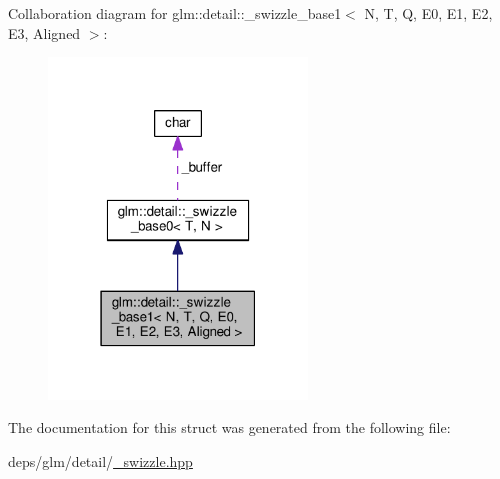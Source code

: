Collaboration diagram for glm\+:\+:detail\+:\+:\+\_\+swizzle\+\_\+base1$<$ N, T, Q, E0, E1, E2, E3, Aligned $>$\+:
\nopagebreak
\begin{figure}[H]
\begin{center}
\leavevmode
\includegraphics[width=195pt]{d6/d25/structglm_1_1detail_1_1__swizzle__base1__coll__graph}
\end{center}
\end{figure}


The documentation for this struct was generated from the following file\+:\begin{DoxyCompactItemize}
\item 
deps/glm/detail/\hyperlink{__swizzle_8hpp}{\+\_\+swizzle.\+hpp}\end{DoxyCompactItemize}
